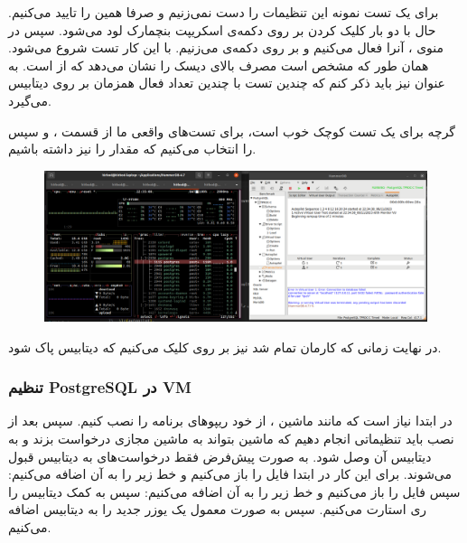 برای یک تست نمونه این تنظیمات را دست نمی‌زنیم و صرفا همین را تایید می‌کنیم. حال با دو بار کلیک کردن بر روی دکمه‌ی
اسکریپت بنچمارک لود می‌شود. سپس در منوی
،
آنرا فعال می‌کنیم و بر روی دکمه‌ی
می‌زنیم. با این کار تست شروع می‌شود. همان طور که مشخص است
مصرف بالای دیسک را نشان می‌دهد که از
است. به عنوان
نیز باید ذکر کنم که
چندین تست با چندین تعداد فعال همزمان بر روی دیتابیس می‌گیرد.

گرچه
برای یک تست کوچک خوب است، برای تست‌های واقعی ما از  قسمت
،  و سپس 
را انتخاب می‌کنیم که مقدار
را نیز داشته باشیم.

\begin{figure}[H]
    \centering
    \includegraphics[scale=0.23]{pictures/hammerdb/sample-run.png}
    \caption{}
\end{figure}

در نهایت زمانی که کارمان تمام شد نیز بر روی
کلیک می‌کنیم که دیتابیس پاک شود.

\subsubsection{تنظیم PostgreSQL در VM}
در ابتدا نیاز است که مانند ماشین
، از خود ریپوهای 
برنامه را نصب کنیم. سپس بعد از نصب باید تنظیماتی انجام دهیم که ماشین
بتواند به ماشین مجازی درخواست بزند و به دیتابیس آن وصل شود. به صورت پیش‌فرض فقط درخواست‌های
به دیتابیس قبول می‌شوند. برای این کار در ابتدا فایل
را باز می‌کنیم و خط زیر را به آن اضافه می‌کنیم:
سپس فایل
را باز می‌کنیم و خط زیر را به آن اضافه می‌کنیم:
سپس به کمک
دیتابیس را ری استارت می‌کنیم. سپس به صورت معمول یک یوزر جدید را به دیتابیس اضافه می‌کنیم.